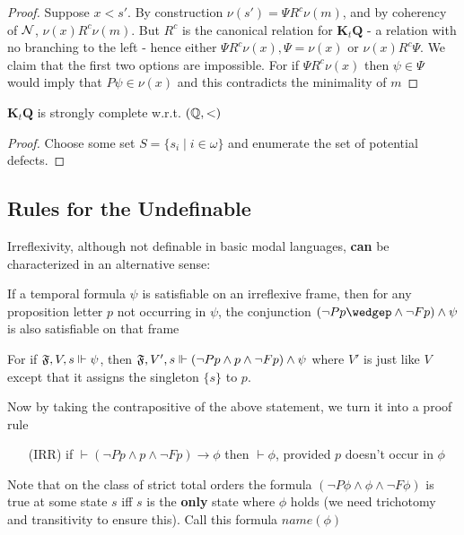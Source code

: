 \documentclass[11pt]{article}
\newcommand{\KtQ}{\textbf{K}_t\textbf{Q}}
\begin{document}
\begin{proof}
Suppose \(x<s'\). By construction \(\nu(s')=\Psi R^c\nu(m)\), and by coherency
of \(\mathcal{N}\), \(\nu(x)R^c\nu(m)\). But \(R^c\) is the canonical relation for
\(\KtQ\) - a relation with no branching to the left - hence either \(\Psi
   R^c\nu(x),\Psi=\nu(x)\) or \(\nu(x)R^c\Psi\). We claim that the first two
options are impossible. For if \(\Psi R^c\nu(x)\) then \(\psi\in\Psi\) would
imply that \(P\psi\in\nu(x)\) and this contradicts the minimality of \(m\)
\end{proof}

\begin{theorem}[]
\(\KtQ\) is strongly complete w.r.t. \((\mathbb{Q},<)\)
\end{theorem}

\begin{proof}
Choose some set \(S=\{s_i\mid i\in\omega\}\) and enumerate the set of
potential defects.
\end{proof}
\subsection{Rules for the Undefinable}
\label{sec:orgf3e5767}
Irreflexivity, although not definable in basic modal languages, \textbf{can} be
characterized in an alternative sense:
\begin{center}
If a temporal formula \(\psi\) is satisfiable on an irreflexive frame, then for any
proposition letter \(p\) not occurring in \(\psi\), the conjunction \((\neg
   Pp\wedgep\wedge\neg Fp)\wedge\psi\) is also satisfiable on that frame
\end{center}
For if \(\mathfrak{F},V,s\Vdash\psi\), then
\(\mathfrak{F},V',s\Vdash(\neg Pp\wedge p\wedge\neg Fp)\wedge\psi\) where \(V'\) is
just like \(V\) except that it assigns the singleton \(\{s\}\) to \(p\).

Now by taking the contrapositive of the above statement, we turn it into a
proof rule

\begin{itemize}
\item [(IRR)] if \(\vdash(\neg Pp\wedge p\wedge\neg Fp)\to\phi\) then \(\vdash\phi\), provided
\(p\) doesn't occur in \(\phi\)
\end{itemize}

Note that on the class of strict total orders the formula
\((\neg P\phi\wedge\phi\wedge\neg F\phi)\) is true at some state \(s\) iff
\(s\) is the \textbf{only} state where \(\phi\) holds (we need trichotomy and transitivity to
ensure this). Call this formula \(name(\phi)\)
\end{document}
